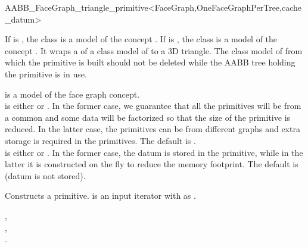 \ccRefPageBegin

\begin{ccRefClass}{AABB_FaceGraph_triangle_primitive<FaceGraph,OneFaceGraphPerTree,cache_datum>}

\ccDefinition
  
If  is , the class is a model of the concept .
If  is , the class  is a model of the concept .
It wraps a  of a class model of  to a 3D triangle.
The class model of  from which the primitive is built should not be deleted
while the AABB tree holding the primitive is in use.



\ccParameters
{} is a model of the face graph concept.\\
 is either  or . In the former case, we guarantee that all the primitives will be from a common  and some data 
will be factorized so that the size of the primitive is reduced. In the latter case, the primitives can be from different graphs and extra storage is required in the primitives. The default is .\\
 is either  or . In the former case, the datum is stored in the primitive, while in the latter it is constructed on the fly to reduce
the memory footprint. The default is  (datum is not stored).\\


\ccTypes
{}
\ccGlue
{}
\ccGlue
{}

\ccCreation
{}

{Constructs a primitive.  is an input iterator with  as .}


\ccSeeAlso

,\\
,\\
.\\

\end{ccRefClass}

\ccRefPageEnd
